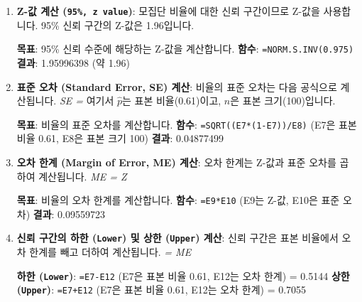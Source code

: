 \documentclass[11pt,a4paper]{book}
\newcommand{\excel}[1]{\texttt{#1}}
\newcommand{\formula}[1]{\textit{#1}}
\theoremstyle{definition}
\begin{document}
\begin{enumerate}
\begin{enumerate}
\begin{enumerate}
    \item \textbf{Z-값 계산 (\excel{95\%, z value})}:
    모집단 비율에 대한 신뢰 구간이므로 Z-값을 사용합니다. 95\% 신뢰 구간의 Z-값은 1.96입니다.
    \begin{examplebox}[title=Excel NORM.S.INV 함수 사용법]
        \textbf{목표}: 95\% 신뢰 수준에 해당하는 Z-값을 계산합니다.
        \textbf{함수}: \texttt{=NORM.S.INV(0.975)}
        \textbf{결과}: 1.95996398 (약 1.96)
    \end{examplebox}

    \item \textbf{표준 오차 (Standard Error, SE) 계산}:
    비율의 표준 오차는 다음 공식으로 계산됩니다.
    \formula{SE = }
    여기서 $\hat{p}$는 표본 비율(0.61)이고, $n$은 표본 크기(100)입니다.
    \begin{examplebox}[title=Excel SQRT 함수를 이용한 표준 오차 계산]
        \textbf{목표}: 비율의 표준 오차를 계산합니다.
        \textbf{함수}: \texttt{=SQRT((E7*(1-E7))/E8)} (E7은 표본 비율 0.61, E8은 표본 크기 100)
        \textbf{결과}: 0.04877499
    \end{examplebox}

    \item \textbf{오차 한계 (Margin of Error, ME) 계산}:
    오차 한계는 Z-값과 표준 오차를 곱하여 계산됩니다.
    \formula{ME = Z \times {}}
    \begin{examplebox}[title=Excel 오차 한계 계산]
        \textbf{목표}: 비율의 오차 한계를 계산합니다.
        \textbf{함수}: \texttt{=E9*E10} (E9는 Z-값, E10은 표준 오차)
        \textbf{결과}: 0.09559723
    \end{examplebox}

    \item \textbf{신뢰 구간의 하한 (\excel{Lower}) 및 상한 (\excel{Upper}) 계산}:
    신뢰 구간은 표본 비율에서 오차 한계를 빼고 더하여 계산됩니다.
    \formula{ =  \pm ME}
    \begin{examplebox}[title=Excel 신뢰 구간 계산]
        \textbf{하한 (\excel{Lower})}: \texttt{=E7-E12} (E7은 표본 비율 0.61, E12는 오차 한계) = 0.5144
        \textbf{상한 (\excel{Upper})}: \texttt{=E7+E12} (E7은 표본 비율 0.61, E12는 오차 한계) = 0.7055
    \end{examplebox}


\end{enumerate}
\end{enumerate}
\end{enumerate}
\end{document}
